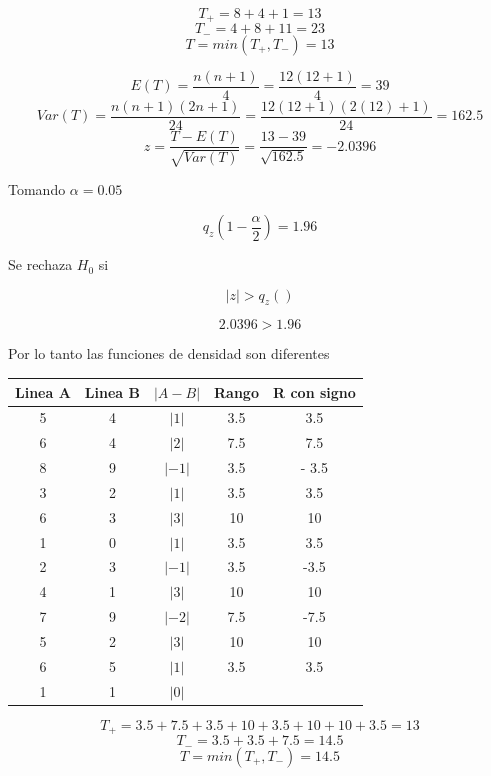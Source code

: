 \documentclass{article}
\begin{document}
\[T_{+} = 8+4+1 = 13\]
\[T_{-} = 4+8+11 = 23\]
\[T = min(T_{+}, T_{-}) = 13\]

\[
    E(T) = \frac{n(n + 1)}{4} = \frac{12(12 + 1)}{4} = 39
\]
\[
    Var(T) = \frac{n(n + 1)(2n + 1)}{24} = \frac{12(12 + 1)(2(12) + 1)}{24} =162.5
\]
\[
    z = \frac{T - E(T)}{\sqrt{Var(T)}} = \frac{13 - 39}{\sqrt{162.5}} = -2.0396
\]

Tomando $\alpha = 0.05$

\[q_z(1 - \frac{\alpha}{2}) = 1.96\]

Se rechaza $H_0$ si

\[|z| > q_z()\]

\[2.0396 > 1.96\]

Por lo tanto las funciones de densidad son diferentes

\begin{center}
    \begin{tabular}{c c c c c}
        Linea A & Linea B & $| A - B|$ & Rango & R con signo \\
        \hline
        5       & 4       & $|1|$      & 3.5   & 3.5         \\
        6       & 4       & $|2|$      & 7.5   & 7.5         \\
        8       & 9       & $|-1|$     & 3.5   & - 3.5       \\
        3       & 2       & $|1|$      & 3.5   & 3.5         \\
        6       & 3       & $|3|$      & 10    & 10          \\
        1       & 0       & $|1|$      & 3.5   & 3.5         \\
        2       & 3       & $|-1|$     & 3.5   & -3.5        \\
        4       & 1       & $|3|$      & 10    & 10          \\
        7       & 9       & $|-2|$     & 7.5   & -7.5        \\
        5       & 2       & $|3|$      & 10    & 10          \\
        6       & 5       & $|1|$      & 3.5   & 3.5         \\
        1       & 1       & $|0|$      &       &             \\
    \end{tabular}
\end{center}

\[T_{+} = 3.5+7.5+3.5+10+3.5+10+10+3.5 = 13\]
\[T_{-} = 3.5+3.5+7.5 = 14.5\]
\[T = min(T_{+}, T_{-}) = 14.5\]
\end{document}
